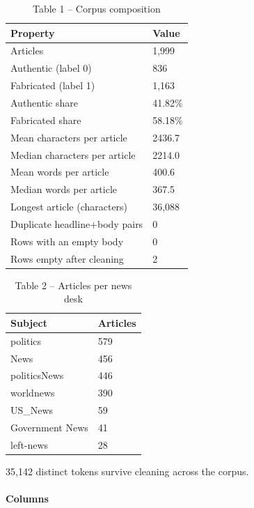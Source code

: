 \documentclass[conference,a4paper]{IEEEtran}
\begin{document}
\begin{table}[!t]
  \centering
  \small
  \caption{Table 1 -- Corpus composition}
  \label{tab:table1corpuscomposition}
  \begin{tabular}{ll}
    \toprule
    Property & Value \\
    \midrule
    Articles & 1,999 \\
    Authentic (label 0) & 836 \\
    Fabricated (label 1) & 1,163 \\
    Authentic share & 41.82\% \\
    Fabricated share & 58.18\% \\
    Mean characters per article & 2436.7 \\
    Median characters per article & 2214.0 \\
    Mean words per article & 400.6 \\
    Median words per article & 367.5 \\
    Longest article (characters) & 36,088 \\
    Duplicate headline+body pairs & 0 \\
    Rows with an empty body & 0 \\
    Rows empty after cleaning & 2 \\
    \bottomrule
  \end{tabular}
\end{table}

\begin{table}[!t]
  \centering
  \small
  \caption{Table 2 -- Articles per news desk}
  \label{tab:table2articlespernewsdesk}
  \begin{tabular}{ll}
    \toprule
    Subject & Articles \\
    \midrule
    politics & 579 \\
    News & 456 \\
    politicsNews & 446 \\
    worldnews & 390 \\
    US\_News & 59 \\
    Government News & 41 \\
    left-news & 28 \\
    \bottomrule
  \end{tabular}
\end{table}

35,142 distinct tokens survive cleaning across the corpus.

\paragraph{Columns}
\end{document}
